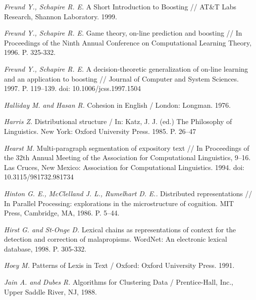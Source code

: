 \documentclass{article}
\begin{document}
\begin{articletext}
\begin{thebibliography}{9}


\textit{Freund Y., Schapire R. E. }A Short Introduction to Boosting // AT\&T Labs Research, Shannon Laboratory.  1999.

\textit{Freund Y.,  Schapire R. E. }Game theory, on-line prediction and boosting // In Proceedings of the Ninth Annual Conference on Computational Learning Theory,  1996. P. 325-332.

\textit{Freund Y.,  Schapire R. E. }A decision-theoretic generalization of on-line learning and an application to boosting // Journal of Computer and System Sciences. 1997. P. 119–139. doi: 10.1006/jcss.1997.1504

\textit{Halliday M. and  Hasan R. }Cohesion in English / London: Longman. 1976. 

\textit{Harris Z. }Distributional structure / In: Katz, J. J. (ed.) The Philosophy of Linguistics. New York: Oxford University Press. 1985. P. 26–47

\textit{Hearst M. }Multi-paragraph segmentation of expository text // In Proceedings of the 32th Annual Meeting of the Association for Computational Linguistics, 9–16. Las Cruces, New Mexico: Association for Computational Linguistics. 1994. doi: 10.3115/981732.981734

\textit{Hinton G. E.,  McClelland J. L.,  Rumelhart D. E.. }Distributed representations // In Parallel Processing: explorations in the microstructure of cognition. MIT Press, Cambridge, MA, 1986. P. 5–44.

\textit{Hirst G. and  St-Onge D. }Lexical chains as representations of context for the detection and correction of malapropisms. WordNet: An electronic lexical database, 1998. P. 305-332.

\textit{Hoey M. }Patterns of Lexis in Text / Oxford: Oxford University Press. 1991. 

\textit{Jain A. and  Dubes R. }Algorithms for Clustering Data / Prentice-Hall, Inc., Upper Saddle River, NJ, 1988.


\end{thebibliography}
\end{articletext}
\end{document}
